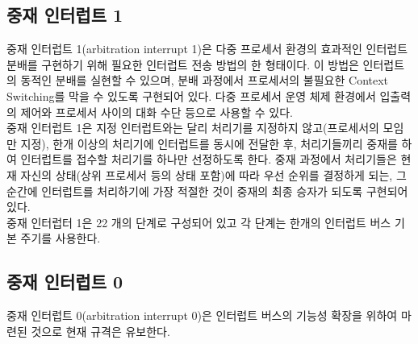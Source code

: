 \subsection{중재 인터럽트 1}
중재 인터럽트 1(arbitration interrupt 1)은 다중 프로세서 환경의
효과적인 인터럽트 분배를 구현하기 위해 필요한
인터럽트 전송 방법의 한 형태이다. 이 방법은 인터럽트의 동적인 분배를 실현할 수 있으며,
분배 과정에서 프로세서의 불필요한 Context Switching를 막을 수 있도록 구현되어 있다.
다중 프로세서 운영 체제 환경에서 입출력의 제어와 프로세서 사이의 대화 수단 등으로 사용할 수 있다. \\
중재 인터럽트 1은 지정 인터럽트와는 달리 처리기를 지정하지 않고(프로세서의 모임만 지정),
한개 이상의 처리기에 인터럽트를 동시에 전달한 후, 처리기들끼리 중재를 하여
인터럽트를 접수할 처리기를 하나만 선정하도록 한다.
중재 과정에서 처리기들은 현재 자신의 상태(상위 프로세서 등의 상태 포함)에 따라
우선 순위를 결정하게 되는, 그 순간에 인터럽트를 처리하기에 가장 적절한 것이
중재의 최종 승자가 되도록 구현되어 있다. \\
중재 인터럽터 1은 22 개의 단계로 구성되어 있고 각 단계는 한개의 인터럽트 버스 기본 주기를 사용한다.
%
\subsection{중재 인터럽트 0}
중재 인터럽트 0(arbitration interrupt 0)은 인터럽트 버스의 기능성 확장을 위하여 마련된 것으로
현재 규격은 유보한다.
%
